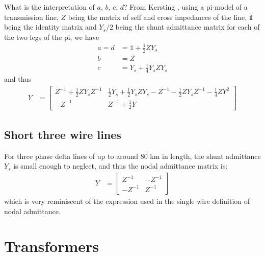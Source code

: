 \documentclass[11pt]{article}
\newcommand{\Id}{\mathds{1}}
\begin{document}
What is the interpretation of $a$, $b$, $c$, $d$? From Kersting \cite{KerstingXXXXa}, using a pi-model of a transmission line, $Z$ being the matrix of self and cross impedances of the line, $\Id$ being the identity matrix and $Y_s/2$ being the shunt admittance matrix for each of the two legs of the pi, we have
\begin{align}
a = d &= \Id + \frac{1}{2}ZY_s \\
b &= Z \\
c &= Y_s + \frac{1}{4}Y_s Z Y_s
\end{align}
and thus
\begin{align}
Y &= \begin{bmatrix} Z^{-1} + \frac{1}{2}ZY_sZ^{-1} & \frac{1}{2}Y_s + \frac{1}{2}Y_sZY_s - Z^{-1}-\frac{1}{2}ZY_sZ^{-1}-\frac{1}{4}ZY^2 \\
-Z^{-1} & Z^{-1}+\frac{1}{2}Y \end{bmatrix} 
\end{align}
\subsection{Short three wire lines}
For three phase delta lines of up to around 80 km in length, the shunt admittance $Y_s$ is small enough to neglect, and thus the nodal admittance matrix is:
\begin{align}
	Y &=
	\begin{bmatrix} Z^{-1} & -Z^{-1} \\ -Z^{-1} & Z^{-1} \end{bmatrix}
\end{align}
which is very reminiscent of the expression used in the single wire definition of nodal admittance.
\section{Transformers}
\end{document}
